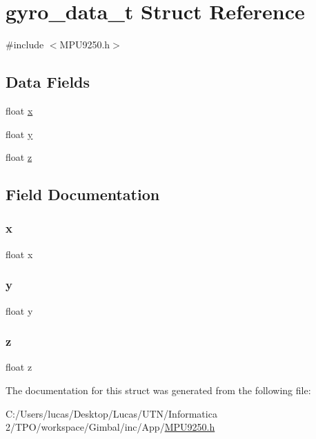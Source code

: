 \hypertarget{structgyro__data__t}{}\section{gyro\+\_\+data\+\_\+t Struct Reference}
\label{structgyro__data__t}


{\ttfamily \#include $<$M\+P\+U9250.\+h$>$}

\subsection*{Data Fields}
\begin{DoxyCompactItemize}
\item 
float \mbox{\hyperlink{structgyro__data__t_ad0da36b2558901e21e7a30f6c227a45e}{x}}
\item 
float \mbox{\hyperlink{structgyro__data__t_aa4f0d3eebc3c443f9be81bf48561a217}{y}}
\item 
float \mbox{\hyperlink{structgyro__data__t_af73583b1e980b0aa03f9884812e9fd4d}{z}}
\end{DoxyCompactItemize}


\subsection{Field Documentation}
\mbox{\label{structgyro__data__t_ad0da36b2558901e21e7a30f6c227a45e}} 
\subsubsection{\texorpdfstring{x}{x}}
{\footnotesize\ttfamily float x}

\mbox{\label{structgyro__data__t_aa4f0d3eebc3c443f9be81bf48561a217}} 
\subsubsection{\texorpdfstring{y}{y}}
{\footnotesize\ttfamily float y}

\mbox{\label{structgyro__data__t_af73583b1e980b0aa03f9884812e9fd4d}} 
\subsubsection{\texorpdfstring{z}{z}}
{\footnotesize\ttfamily float z}



The documentation for this struct was generated from the following file\+:\begin{DoxyCompactItemize}
\item 
C\+:/\+Users/lucas/\+Desktop/\+Lucas/\+U\+T\+N/\+Informatica 2/\+T\+P\+O/workspace/\+Gimbal/inc/\+App/\mbox{\hyperlink{_m_p_u9250_8h}{M\+P\+U9250.\+h}}\end{DoxyCompactItemize}
